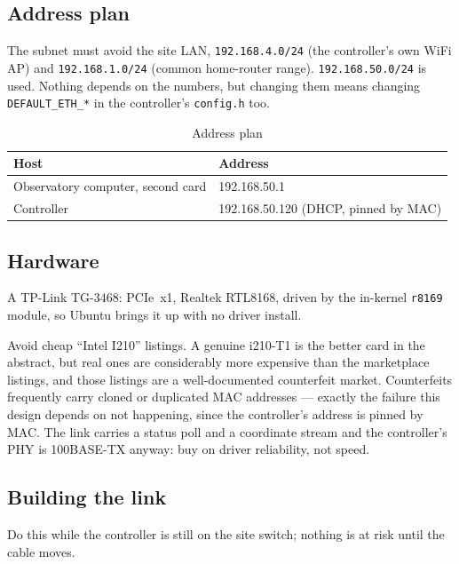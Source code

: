 \documentclass[11pt,a4paper]{article}
\begin{document}
\subsection{Address plan}

The subnet must avoid the site LAN, \texttt{192.168.4.0/24} (the controller's own WiFi AP) and \texttt{192.168.1.0/24} (common home-router range). \texttt{192.168.50.0/24} is used. Nothing depends on the numbers, but changing them means changing \texttt{DEFAULT\_ETH\_*} in the controller's \texttt{config.h} too.

\begin{table}[H]
\centering
\caption{Address plan}
\begin{tabular}{ll}
\toprule
\textbf{Host} & \textbf{Address} \\
\midrule
Observatory computer, second card & 192.168.50.1 \\
Controller & 192.168.50.120 (DHCP, pinned by MAC) \\
\bottomrule
\end{tabular}
\end{table}

\subsection{Hardware}

A TP-Link TG-3468: PCIe~x1, Realtek RTL8168, driven by the in-kernel \texttt{r8169} module, so Ubuntu brings it up with no driver install.

Avoid cheap ``Intel I210'' listings. A genuine i210-T1 is the better card in the abstract, but real ones are considerably more expensive than the marketplace listings, and those listings are a well-documented counterfeit market. Counterfeits frequently carry cloned or duplicated MAC addresses --- exactly the failure this design depends on not happening, since the controller's address is pinned by MAC. The link carries a status poll and a coordinate stream and the controller's PHY is 100BASE-TX anyway: buy on driver reliability, not speed.

\subsection{Building the link}

Do this while the controller is still on the site switch; nothing is at risk until the cable moves.
\end{document}
